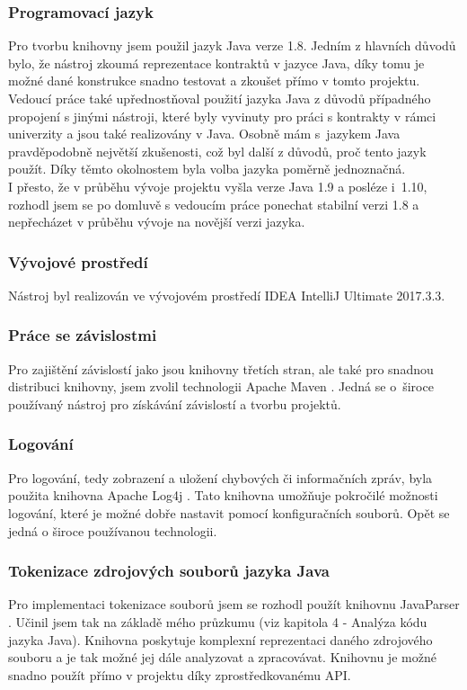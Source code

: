 	    	\subsubsection{Programovací jazyk}
				Pro tvorbu knihovny jsem použil jazyk Java verze 1.8. Jedním z hlavních důvodů bylo, že nástroj zkoumá reprezentace kontraktů v jazyce Java, díky tomu je možné dané konstrukce snadno testovat a zkoušet přímo v tomto projektu. Vedoucí práce také upřednostňoval použití jazyka Java z důvodů případného propojení s jinými nástroji, které byly vyvinuty pro práci s kontrakty v rámci univerzity a jsou také realizovány v Java. Osobně mám s~jazykem Java pravděpodobně největší zkušenosti, což byl další z důvodů, proč tento jazyk použít. Díky těmto okolnostem byla volba jazyka poměrně jednoznačná.\\
				
				I přesto, že v průběhu vývoje projektu vyšla verze Java 1.9 a posléze i~1.10, rozhodl jsem se po domluvě s vedoucím práce ponechat stabilní verzi 1.8 a nepřecházet v průběhu vývoje na novější verzi jazyka.
				
			\subsubsection{Vývojové prostředí}				
				Nástroj byl realizován ve vývojovém prostředí IDEA IntelliJ Ultimate 2017.3.3.
	    	
			\subsubsection{Práce se závislostmi}
				Pro zajištění závislostí jako jsou knihovny třetích stran, ale také pro snadnou distribuci knihovny, jsem zvolil technologii Apache Maven \cite{maven}. Jedná se o~široce používaný nástroj pro získávání závislostí a tvorbu projektů.
				
			\subsubsection{Logování}
				Pro logování, tedy zobrazení a uložení chybových či informačních zpráv, byla použita knihovna Apache Log4j \cite{log4j}. Tato knihovna umožňuje pokročilé možnosti logování, které je možné dobře nastavit pomocí konfiguračních souborů. Opět se jedná o široce používanou technologii.
				
			\subsubsection{Tokenizace zdrojových souborů jazyka Java}
				Pro implementaci tokenizace souborů jsem se rozhodl použít knihovnu JavaParser \cite{javaparser}. Učinil jsem tak na základě mého průzkumu (viz kapitola 4 - Analýza kódu jazyka Java). Knihovna poskytuje komplexní reprezentaci daného zdrojového souboru a je tak možné jej dále analyzovat a zpracovávat. Knihovnu je možné snadno použít přímo v projektu díky zprostředkovanému API.
			
